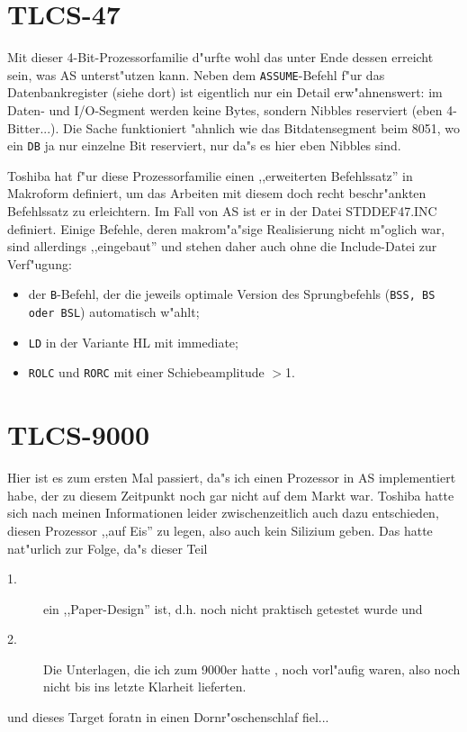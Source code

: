 \documentclass[12pt,a4paper,twoside]{report}
\newcommand{\tty}[1]{{\tt #1}}
\newcommand{\asname}{AS}
\begin{document}

\section{TLCS-47}

Mit dieser 4-Bit-Prozessorfamilie d"urfte wohl das unter Ende dessen
erreicht sein, was \asname{} unterst"utzen kann.  Neben dem \tty{ASSUME}-Befehl
f"ur das Datenbankregister (siehe dort) ist eigentlich nur ein Detail
erw"ahnenswert: im Daten- und I/O-Segment werden keine Bytes, sondern
Nibbles reserviert (eben 4-Bitter...).  Die Sache funktioniert "ahnlich
wie das Bitdatensegment beim 8051, wo ein \tty{DB} ja nur einzelne Bit
reserviert, nur da"s es hier eben Nibbles sind.
\par
Toshiba hat f"ur diese Prozessorfamilie einen ,,erweiterten Befehlssatz''
in Makroform definiert, um das Arbeiten mit diesem doch recht
beschr"ankten Befehlssatz zu erleichtern.  Im Fall von \asname{} ist er in der
Datei STDDEF47.INC definiert.  Einige Befehle, deren makrom"a"sige
Realisierung nicht m"oglich war, sind allerdings ,,eingebaut'' und stehen
daher auch ohne die Include-Datei zur Verf"ugung:
\begin{itemize}
\item{der \tty{B}-Befehl, der die jeweils optimale Version des
      Sprungbefehls (\tty{BSS, BS oder BSL}) automatisch w"ahlt;}
\item{\tty{LD} in der Variante HL mit immediate;}
\item{\tty{ROLC} und \tty{RORC} mit einer Schiebeamplitude $>$1.}
\end{itemize}


\section{TLCS-9000}

Hier ist es zum ersten Mal passiert, da"s ich einen Prozessor in \asname{}
implementiert habe, der zu diesem Zeitpunkt noch gar nicht auf dem
Markt war.  Toshiba hatte sich nach meinen Informationen leider
zwischenzeitlich auch dazu entschieden, diesen Prozessor ,,auf Eis''
zu legen, also auch kein Silizium geben.  Das hatte nat"urlich zur Folge,
da"s dieser Teil
\begin{description}
\item[1.]{ein ,,Paper-Design'' ist, d.h. noch nicht praktisch getestet
          wurde und}
\item[2.]{Die Unterlagen, die ich zum 9000er hatte \cite{Tosh9000},
          noch vorl"aufig waren, also noch nicht bis ins letzte Klarheit
          lieferten.}
\end{description}
und dieses Target foratn in einen Dornr"oschenschlaf fiel...
\end{document}
